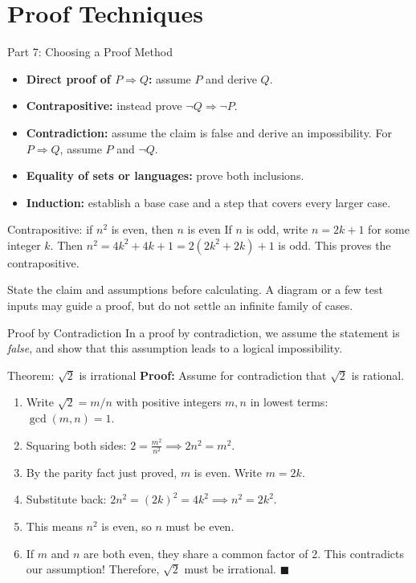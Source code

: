 \documentclass[10pt]{beamer}
\begin{document}
\section{Proof Techniques}

\begin{frame}{Part 7: Choosing a Proof Method}
  \small
  \begin{itemize}
    \item \textbf{Direct proof of $P\Rightarrow Q$:} assume $P$ and derive $Q$.
    \item \textbf{Contrapositive:} instead prove $\neg Q\Rightarrow\neg P$.
    \item \textbf{Contradiction:} assume the claim is false and derive an
      impossibility. For $P\Rightarrow Q$, assume $P$ and $\neg Q$.
    \item \textbf{Equality of sets or languages:} prove both inclusions.
    \item \textbf{Induction:} establish a base case and a step that covers
      every larger case.
  \end{itemize}
  \pause
  \begin{exampleblock}{Contrapositive: if $n^2$ is even, then $n$ is even}
    If $n$ is odd, write $n=2k+1$ for some integer $k$. Then
    $n^2=4k^2+4k+1=2(2k^2+2k)+1$ is odd. This proves the contrapositive.
  \end{exampleblock}
  \pause
  State the claim and assumptions before calculating. A diagram or a few
  test inputs may guide a proof, but do not settle an infinite family of cases.
\end{frame}

\begin{frame}{Proof by Contradiction}
  \small
  In a proof by contradiction, we assume the statement is \textit{false}, and show that this assumption leads to a logical impossibility.
  \pause
  \begin{block}{Theorem: $\sqrt{2}$ is irrational}
    \textbf{Proof:} Assume for contradiction that $\sqrt{2}$ is rational. 
    \begin{enumerate}
        \item Write $\sqrt{2}=m/n$ with positive integers $m,n$ in lowest
          terms: $\gcd(m,n)=1$.
        \item Squaring both sides: $2 = \frac{m^2}{n^2} \implies 2n^2 = m^2$.
        \item By the parity fact just proved, $m$ is even. Write $m=2k$.
        \pause
        \item Substitute back: $2n^2 = (2k)^2 = 4k^2 \implies n^2 = 2k^2$.
        \item This means $n^2$ is even, so $n$ must be even.
        \item If $m$ and $n$ are both even, they share a common factor of 2. This contradicts our assumption! Therefore, $\sqrt{2}$ must be irrational. \hfill $\blacksquare$
    \end{enumerate}
  \end{block}
\end{frame}
\end{document}
